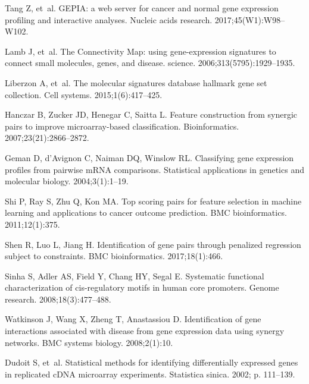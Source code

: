 \documentclass[10pt,letterpaper]{article}
\begin{document}
\begin{thebibliography}{10}

Tang Z, et~al.
\newblock GEPIA: a web server for cancer and normal gene expression profiling
  and interactive analyses.
\newblock Nucleic acids research. 2017;45(W1):W98--W102.

Lamb J, et~al.
\newblock The Connectivity Map: using gene-expression signatures to connect
  small molecules, genes, and disease.
\newblock science. 2006;313(5795):1929--1935.

Liberzon A, et~al.
\newblock The molecular signatures database hallmark gene set collection.
\newblock Cell systems. 2015;1(6):417--425.

Hanczar B, Zucker JD, Henegar C, Saitta L.
\newblock Feature construction from synergic pairs to improve microarray-based
  classification.
\newblock Bioinformatics. 2007;23(21):2866--2872.

Geman D, d'Avignon C, Naiman DQ, Winslow RL.
\newblock Classifying gene expression profiles from pairwise mRNA comparisons.
\newblock Statistical applications in genetics and molecular biology.
  2004;3(1):1--19.

Shi P, Ray S, Zhu Q, Kon MA.
\newblock Top scoring pairs for feature selection in machine learning and
  applications to cancer outcome prediction.
\newblock BMC bioinformatics. 2011;12(1):375.

Shen R, Luo L, Jiang H.
\newblock Identification of gene pairs through penalized regression subject to
  constraints.
\newblock BMC bioinformatics. 2017;18(1):466.

Sinha S, Adler AS, Field Y, Chang HY, Segal E.
\newblock Systematic functional characterization of cis-regulatory motifs in
  human core promoters.
\newblock Genome research. 2008;18(3):477--488.

Watkinson J, Wang X, Zheng T, Anastassiou D.
\newblock Identification of gene interactions associated with disease from gene
  expression data using synergy networks.
\newblock BMC systems biology. 2008;2(1):10.

Dudoit S, et~al.
\newblock Statistical methods for identifying differentially expressed genes in
  replicated cDNA microarray experiments.
\newblock Statistica sinica. 2002; p. 111--139.


\end{thebibliography}
\end{document}
